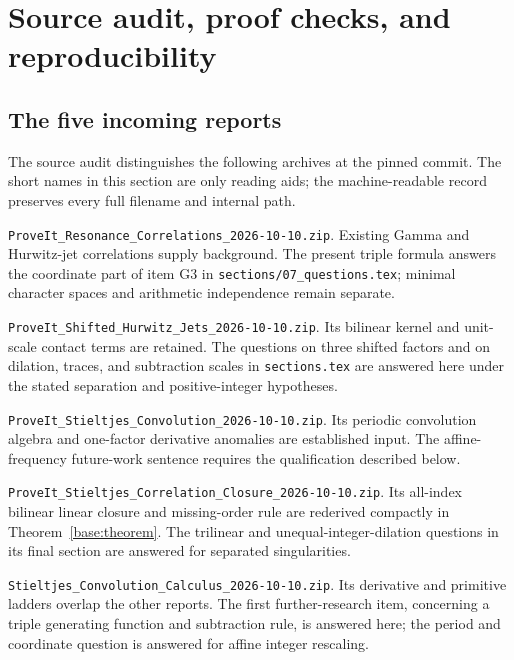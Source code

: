 \section{Source audit, proof checks, and reproducibility}
\label{sec:audit}

\subsection{The five incoming reports}

The source audit distinguishes the following archives at the pinned
commit.  The short names in this section are only reading aids; the
machine-readable record preserves every full filename and internal path.
\begin{description}[style=nextline,leftmargin=13mm]
\item[RC] \nolinkurl{ProveIt_Resonance_Correlations_2026-10-10.zip}.
Existing Gamma and Hurwitz-jet correlations supply background.
The present triple formula answers the coordinate part of item G3
in \nolinkurl{sections/07_questions.tex}; minimal character spaces
and arithmetic independence remain separate.
\item[RJ] \nolinkurl{ProveIt_Shifted_Hurwitz_Jets_2026-10-10.zip}.
Its bilinear kernel and unit-scale contact terms are retained.
The questions on three shifted factors and on dilation, traces, and
subtraction scales in \nolinkurl{sections.tex} are answered here under
the stated separation and positive-integer hypotheses.
\item[SC] \nolinkurl{ProveIt_Stieltjes_Convolution_2026-10-10.zip}.
Its periodic convolution algebra and one-factor derivative anomalies
are established input.  The affine-frequency future-work sentence
requires the qualification described below.
\item[CL] \nolinkurl{ProveIt_Stieltjes_Correlation_Closure_2026-10-10.zip}.
Its all-index bilinear linear closure and missing-order rule are
rederived compactly in Theorem~\ref{base:theorem}.  The trilinear and
unequal-integer-dilation questions in its final section are answered
for separated singularities.
\item[CC] \nolinkurl{Stieltjes_Convolution_Calculus_2026-10-10.zip}.
Its derivative and primitive ladders overlap the other reports.
The first further-research item, concerning a triple generating
function and subtraction rule, is answered here; the period and
coordinate question is answered for affine integer rescaling.
\end{description}

